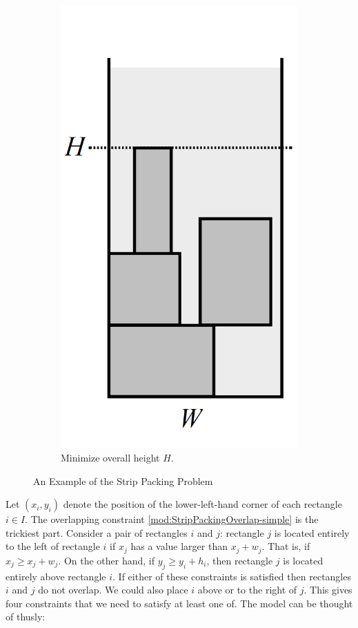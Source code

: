 \begin{figure}[h!]
\begin{subfigure}[b]{.3\textwidth}
	\includegraphics[height=.4\textheight]{Figures/StripPacking1}
	\caption{Minimize overall height $H$.}
	\label{fig:StripPacking-MinHeight}
	\end{subfigure}
	\caption{An Example of the Strip Packing Problem}
	\label{fig:StripPacking}
	\end{figure}

Let $(x_i,y_i)$ denote the position of the lower-left-hand corner of each rectangle $i \in I$. The overlapping constraint \eqref{mod:StripPackingOverlap-simple} is the trickiest part. Consider a pair of rectangles $i$ and $j$: rectangle $j$ is located entirely to the left of rectangle $i$ if $x_j$ has a value larger than $x_j+w_j$. That is, if $x_j \geq x_j+w_j$. On the other hand, if $y_j \geq y_i+h_i$, then rectangle $j$ is located entirely above rectangle $i$. If either of these constraints is satisfied then rectangles $i$ and $j$ do not overlap. We could also place $i$ above or to the right of $j$. This gives four constraints that we need to satisfy at least one of. The model can be thought of thusly:

